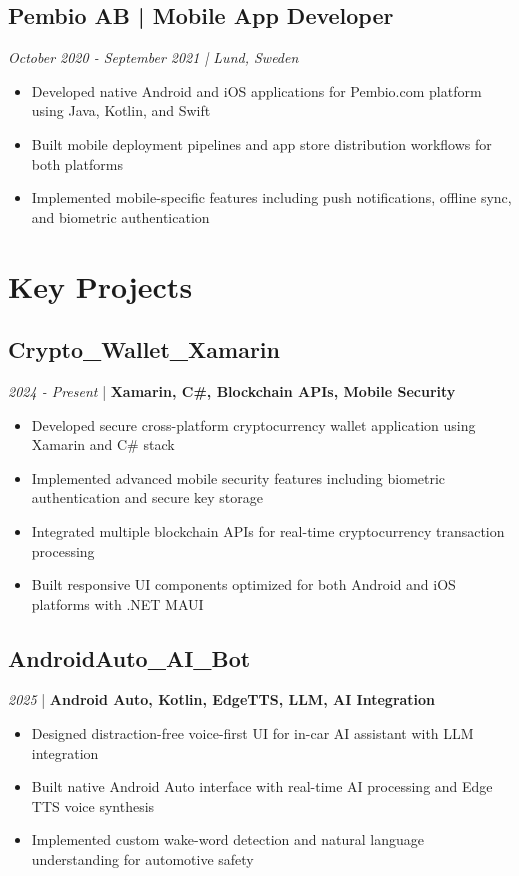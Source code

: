 \documentclass[11pt,a4paper]{article}
\begin{document}
\subsection*{Pembio AB | Mobile App Developer}
\textit{October 2020 - September 2021 | Lund, Sweden}
\begin{itemize}[noitemsep]
\item Developed native Android and iOS applications for Pembio.com platform using Java, Kotlin, and Swift
\item Built mobile deployment pipelines and app store distribution workflows for both platforms
\item Implemented mobile-specific features including push notifications, offline sync, and biometric authentication
\end{itemize}

\section*{Key Projects}

\subsection*{Crypto\_Wallet\_Xamarin}
\textit{2024 - Present} | \textbf{Xamarin, C\#, Blockchain APIs, Mobile Security}
\begin{itemize}[noitemsep]
\item Developed secure cross-platform cryptocurrency wallet application using Xamarin and C\# stack
\item Implemented advanced mobile security features including biometric authentication and secure key storage
\item Integrated multiple blockchain APIs for real-time cryptocurrency transaction processing
\item Built responsive UI components optimized for both Android and iOS platforms with .NET MAUI
\end{itemize}

\subsection*{AndroidAuto\_AI\_Bot}
\textit{2025} | \textbf{Android Auto, Kotlin, EdgeTTS, LLM, AI Integration}
\begin{itemize}[noitemsep]
\item Designed distraction-free voice-first UI for in-car AI assistant with LLM integration
\item Built native Android Auto interface with real-time AI processing and Edge TTS voice synthesis
\item Implemented custom wake-word detection and natural language understanding for automotive safety
\end{itemize}
\end{document}
